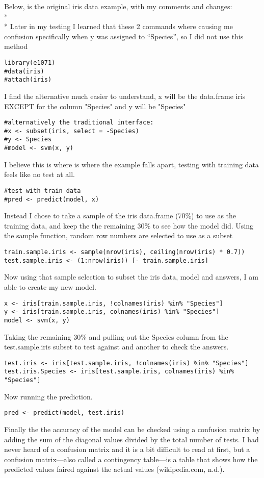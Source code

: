 \documentclass[10pt]{article}
\begin{document}
Below, is the original iris data example, with my comments and changes:\\*
\\*
Later in my testing I learned that these 2 commands where causing me confusion specifically when y was assigned to “Species”, so I did not use this method 
\begin{verbatim}
library(e1071) 
#data(iris) 
#attach(iris) 
\end{verbatim}
I find the alternative much easier to understand, x will be the data.frame iris EXCEPT for the column "Species" and y will be "Species" 
\begin{verbatim}
#alternatively the traditional interface: 
#x <- subset(iris, select = -Species) 
#y <- Species 
#model <- svm(x, y)  
\end{verbatim}
I believe this is where is where the example falls apart, testing with training data feels like no test at all. 
\begin{verbatim}
#test with train data 
#pred <- predict(model, x)
\end{verbatim}
Instead I chose to take a sample of the iris data.frame (70\%) to use as the training data, and keep the the remaining 30\% to see how the model did. Using the sample function, random row numbers are selected to use as a subset 
\begin{verbatim}
train.sample.iris <- sample(nrow(iris), ceiling(nrow(iris) * 0.7)) 
test.sample.iris <- (1:nrow(iris)) [- train.sample.iris] 
\end{verbatim} 
Now using that sample selection to subset the iris data, model and answers, I am able to create my new model. 
\begin{verbatim}
x <- iris[train.sample.iris, !colnames(iris) %in% "Species"] 
y <- iris[train.sample.iris, colnames(iris) %in% "Species"] 
model <- svm(x, y) 
\end{verbatim} 
Taking the remaining 30\% and pulling out the Species column from the test.sample.iris subset to test against and another to check the answers. 
\begin{verbatim}
test.iris <- iris[test.sample.iris, !colnames(iris) %in% "Species"] 
test.iris.Species <- iris[test.sample.iris, colnames(iris) %in% "Species"] 
\end{verbatim}
Now running the prediction. 
\begin{verbatim}
pred <- predict(model, test.iris) 
\end{verbatim}
Finally the the accuracy of the model can be checked using a confusion matrix by adding the sum of the diagonal values divided by the total number of tests. I had never heard of a confusion matrix and it is a bit difficult to read at first, but a confusion matrix—also called a contingency table—is a table that shows how the predicted values faired against the actual values (wikipedia.com, n.d.).
\end{document}
